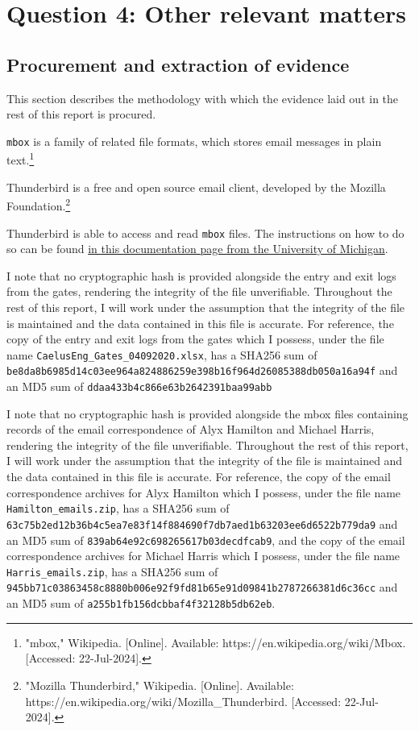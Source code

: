 \section{Question 4: Other relevant matters} %
\label{sec:Question 4: Other relevant matters}

\subsection{Procurement and extraction of evidence} %
\label{sub:Procurement and extraction of evidence}
\begin{myenum}
    \item This section describes the methodology with which the evidence laid out in the rest of this report is procured.
    \item \texttt{mbox} is a family of related file formats, which stores email messages in plain text.\footnote{"mbox," Wikipedia. [Online]. Available: https://en.wikipedia.org/wiki/Mbox. [Accessed: 22-Jul-2024].}
    \item Thunderbird is a free and open source email client, developed by the Mozilla Foundation.\footnote{"Mozilla Thunderbird," Wikipedia. [Online]. Available: https://en.wikipedia.org/wiki/Mozilla\_Thunderbird. [Accessed: 22-Jul-2024].}
    \item Thunderbird is able to access and read \texttt{mbox} files. The instructions on how to do so can be found \href{https://documentation.its.umich.edu/mbox-thunderbird}{in this documentation page from the University of Michigan}.
    \item I note that no cryptographic hash is provided alongside the entry and exit logs from the gates, rendering the integrity of the file unverifiable. Throughout the rest of this report, I will work under the assumption that the integrity of the file is maintained and the data contained in this file is accurate. For reference, the copy of the entry and exit logs from the gates which I possess, under the file name \texttt{CaelusEng\_Gates\_04092020.xlsx}, has a SHA256 sum of \texttt{be8da8b6985d14c03ee964a824886259e398b16f964d26085388db050a16a94f} and an MD5 sum of \texttt{ddaa433b4c866e63b2642391baa99abb}
    \item I note that no cryptographic hash is provided alongside the mbox files containing records of the email correspondence of Alyx Hamilton and Michael Harris, rendering the integrity of the file unverifiable. Throughout the rest of this report, I will work under the assumption that the integrity of the file is maintained and the data contained in this file is accurate. For reference, the copy of the email correspondence archives for Alyx Hamilton which I possess, under the file name \texttt{Hamilton\_emails.zip}, has a SHA256 sum of \texttt{63c75b2ed12b36b4c5ea7e83f14f884690f7db7aed1b63203ee6d6522b779da9} and an MD5 sum of \texttt{839ab64e92c698265617b03decdfcab9}, and the copy of the email correspondence archives for Michael Harris which I possess, under the file name \texttt{Harris\_emails.zip}, has a SHA256 sum of \texttt{945bb71c03863458c8880b006e92f9fd81b65e91d09841b2787266381d6c36cc} and an MD5 sum of \texttt{a255b1fb156dcbbaf4f32128b5db62eb}.

\end{myenum}
